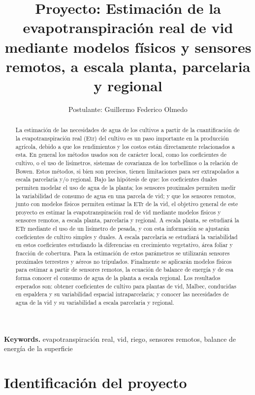 \documentclass[]{article}
\title{%
	\textbf{Proyecto:} Estimación de la evapotranspiración real de vid mediante modelos físicos y sensores remotos, a escala planta, parcelaria y regional}
\author{Postulante: Guillermo Federico Olmedo}
\date{}
\begin{document}
\maketitle

\begin{abstract}
La estimación de las necesidades de agua de los cultivos a partir de la cuantificación de la evapotranspiración real (Etr) del cultivo es un paso importante en la producción agrícola, debido a que los rendimientos y los costos están directamente relacionados a esta. En general los métodos usados son de carácter local, como los coeficientes de cultivo, o el uso de lisímetros, sistemas de covarianza de los torbellinos o la relación de Bowen. Estos métodos, si bien son precisos, tienen limitaciones para ser extrapolados a escala parcelaria y/o regional. Bajo las hipótesis de que: los coeficientes duales permiten modelar el uso de agua de la planta; los sensores proximales permiten medir la variabilidad de consumo de agua en una parcela de vid; y que los sensores remotos, junto con modelos físicos permiten estimar la ETr de la vid, el objetivo general de este proyecto es estimar la evapotranspiración real de vid mediante modelos físicos y sensores remotos, a escala planta, parcelaria y regional. A escala planta, se estudiará la ETr mediante el uso de un lisímetro de pesada, y con esta información se ajustarán coeficientes de cultivo simples y duales. A escala parcelaria se estudiará la variabilidad en estos coeficientes estudiando la diferencias en crecimiento vegetativo, área foliar y fracción de cobertura. Para la estimación de estos parámetros se utilizarán sensores proximales terrestres y aéreos no tripulados. Finalmente se aplicarán modelos físicos para estimar a partir de sensores remotos, la ecuación de balance de energía y de esa forma conocer el consumo de agua de la planta a escala regional. Los resultados esperados son: obtener coeficientes de cultivo para plantas de vid, Malbec, conducidas en espaldera y su variabilidad espacial intraparcelaria;  y conocer las necesidades de agua de la vid y su variabilidad a escala parcelaria y regional.
\end{abstract}

\smallskip
\noindent \textbf{Keywords.} evapotranspiración real, vid, riego, sensores remotos, balance de energía de la superficie

\clearpage

\section{Identificación del proyecto}
\end{document}
